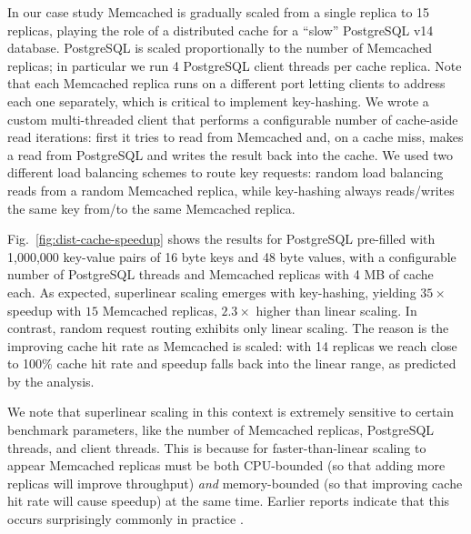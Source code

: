 In our case study Memcached is gradually scaled from a single replica to 15 replicas, playing the role of a distributed cache for a ``slow'' PostgreSQL v14 database. PostgreSQL is scaled proportionally to the number of Memcached replicas; in particular we run 4 PostgreSQL client threads per cache replica. Note that each Memcached replica runs on a different port letting clients to address each one separately, which is critical to implement key-hashing. We wrote a custom multi-threaded client that performs a configurable number of cache-aside read iterations: first it tries to read from Memcached and, on a cache miss, makes a read from PostgreSQL and writes the result back into the cache. We used two different load balancing schemes to route key requests: random load balancing reads from a random Memcached replica, while key-hashing always reads\slash writes the same key from\slash to the same Memcached replica.

Fig.~\ref{fig:dist-cache-speedup} shows the results for PostgreSQL pre-filled with 1,000,000 key-value pairs of 16 byte keys and 48 byte values, with a configurable number of PostgreSQL threads and Memcached replicas with 4 MB of cache each. As expected, superlinear scaling emerges with key-hashing, yielding $35\times$ speedup with $15$ Memcached replicas, $2.3\times$ higher than linear scaling. In contrast, random request routing exhibits only linear scaling. The reason is the improving cache hit rate as Memcached is scaled: with 14 replicas we reach close to 100\% cache hit rate and speedup falls back into the linear range, as predicted by the analysis.

We note that superlinear scaling in this context is extremely sensitive to certain benchmark parameters, like the number of Memcached replicas, PostgreSQL threads, and client threads. This is because for faster-than-linear scaling to appear Memcached replicas must be both CPU-bounded (so that adding more replicas will improve throughput) \emph{and} memory-bounded (so that improving cache hit rate will cause speedup) at the same time. Earlier reports indicate that this occurs surprisingly commonly in practice \cite{dobb-1, dobb-2, 7733347, 80148, 556383, scalability-analyzed}.


